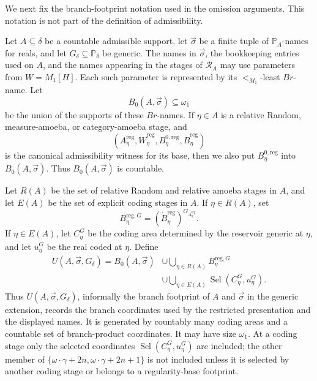\documentclass[a4paper,11pt]{article}
\begin{document}
We next fix the branch-footprint notation used in the omission arguments.  This
notation is not part of the definition of admissibility.

Let \(A\subseteq\delta\) be a countable admissible support, let
\(\vec\sigma\) be a finite tuple of \(\mathbb P_A\)-names for reals, and let
\(G_\delta\subseteq\mathbb P_\delta\) be generic.  The names in
\(\vec\sigma\), the bookkeeping entries used on \(A\), and the names appearing
in the stages of \(\mathcal R_A\) may use parameters from \(W=M_1[H]\).  Each such
parameter is represented by its \(<_{M_1}\)-least \(Br\)-name.  Let
\[
   B_0(A,\vec\sigma)\subseteq\omega_1
\]
be the union of the supports of these \(Br\)-names.  If \(\eta\in A\) is a
relative Random, measure-amoeba, or category-amoeba stage, and
\[
   (A^{\mathrm{reg}}_\eta,
    \dot W^{\mathrm{reg}}_\eta,
    B^{0,\mathrm{reg}}_\eta,
    \dot B^{\mathrm{reg}}_\eta)
\]
is the canonical admissibility witness for its base, then we also put
\(B^{0,\mathrm{reg}}_\eta\) into \(B_0(A,\vec\sigma)\).  Thus
\(B_0(A,\vec\sigma)\) is countable.

Let \(R(A)\) be the set of relative Random and relative amoeba stages in
\(A\), and let \(E(A)\) be the set of explicit coding stages in \(A\).  If
\(\eta\in R(A)\), set
\[
   B^{\mathrm{reg},G}_\eta
   =
   (\dot B^{\mathrm{reg}}_\eta)^{G_{A^{\mathrm{reg}}_\eta}}.
\]
If \(\eta\in E(A)\), let \(C^G_\eta\) be the coding area determined by the
reservoir generic at \(\eta\), and let \(u^G_\eta\) be the real coded at
\(\eta\).  Define
\[
\begin{split}
   U(A,\vec\sigma,G_\delta)=
   B_0(A,\vec\sigma)
   &\cup
   \bigcup_{\eta\in R(A)}B^{\mathrm{reg},G}_\eta \\
   &\cup
   \bigcup_{\eta\in E(A)}
      \operatorname{Sel}(C^G_\eta,u^G_\eta).
\end{split}
\]
Thus \(U(A,\vec\sigma,G_\delta)\), informally the branch footprint of
\(A\) and \(\vec\sigma\) in the generic extension, records the branch
coordinates used by the restricted presentation and the displayed names.  It is
generated by countably many coding areas and a countable set of branch-product
coordinates.  It may have size \(\omega_1\).  At a coding
stage only the selected coordinates
\(\operatorname{Sel}(C^G_\eta,u^G_\eta)\) are included; the other member of
\(\{\omega\cdot\gamma+2n,\omega\cdot\gamma+2n+1\}\) is not included
unless it is selected by another coding stage or belongs to a regularity-base
footprint.
\end{document}
